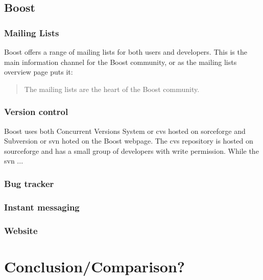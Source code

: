 \documentclass{report} %
\begin{document}
\subsection{Boost}
\subsubsection{Mailing Lists}
Boost offers a range of mailing lists\cite{boostmaillists} for both users and developers. This is the main information channel for the Boost community, or as the mailing lists overview page\cite{boostmaillists} puts it:
\begin{quote}
The mailing lists are the heart of the Boost community.
\end{quote}

\subsubsection{Version control}
Boost uses both Concurrent Versions System or cvs hosted on sorceforge\cite{boostcvssourceforge} and Subversion or svn hoted on the Boost webpage\cite{boostsvn}. The cvs repository is hosted on sourceforge and has a small group of developers with write permission. While the svn ...

\subsubsection{Bug tracker}


\subsubsection{Instant messaging}
\subsubsection{Website}

\section{Conclusion/Comparison?}


\end{document}

